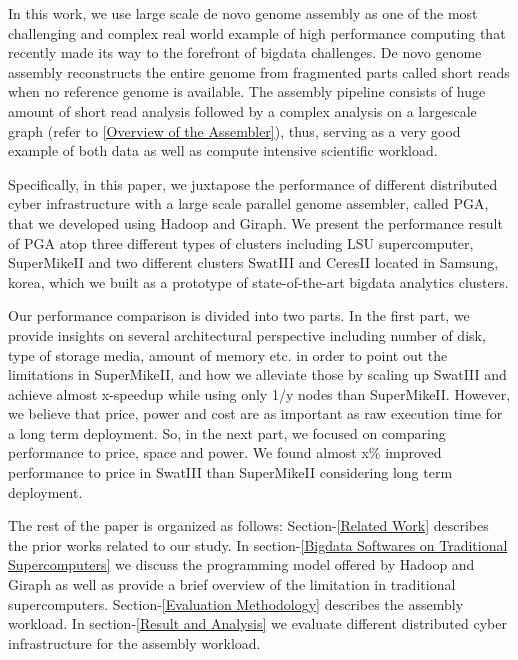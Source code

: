 In this work, we use large scale de novo genome assembly as one of the most challenging and complex real world example of high performance computing that recently made its way to the forefront of bigdata challenges.
De novo genome assembly reconstructs the entire genome from fragmented parts called short reads when no reference genome is available.
The assembly pipeline consists of huge amount of short read analysis followed by a  complex analysis on a largescale graph (refer to \ref{Overview of the Assembler}), thus, serving as a very good example of both data as well as compute intensive scientific workload.

Specifically, in this paper, we juxtapose the performance of different distributed cyber infrastructure with a large scale parallel genome assembler, called PGA, that we developed using Hadoop and Giraph.
We present the performance result of PGA atop three different types of clusters including LSU supercomputer, SuperMikeII and two different clusters SwatIII and CeresII located in Samsung, korea, which we built as a prototype of state-of-the-art bigdata analytics clusters.

Our performance comparison is divided into two parts.
In the first part, we provide insights on several architectural perspective including number of disk, type of storage media, amount of memory etc. in order to point out the limitations in SuperMikeII, and how we alleviate those by scaling up SwatIII and achieve almost x-speedup while using only 1/y nodes than SuperMikeII.
However, we believe that price, power and cost are as important as raw execution time for a long term deployment.
So, in the next part, we focused on comparing performance to price, space and power. 
We found almost x\% improved performance to price in SwatIII than SuperMikeII considering long term deployment.

The rest of the paper is organized as follows:
Section-\ref{Related Work} describes the prior works related to our study.
In section-\ref{Bigdata Softwares on Traditional Supercomputers} we discuss the programming model offered by Hadoop and Giraph as well as provide a brief overview of the limitation in traditional supercomputers.
Section-\ref{Evaluation Methodology} describes the assembly workload.
In section-\ref{Result and Analysis} we evaluate different distributed cyber infrastructure for the assembly workload. 






